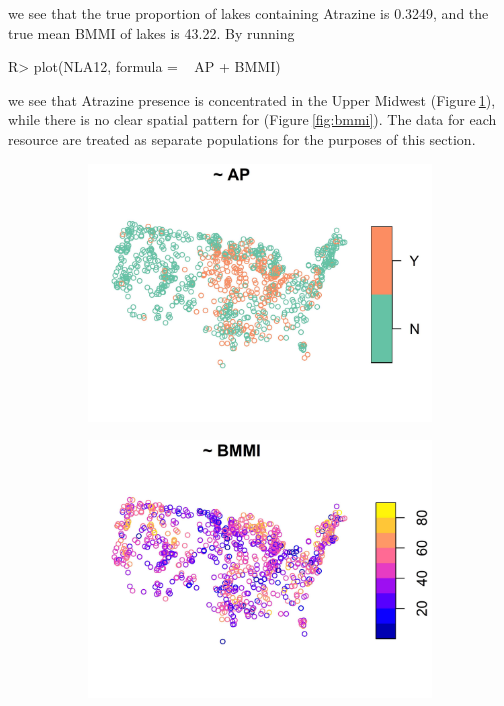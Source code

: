\documentclass[
  shortnames]{jss}
\begin{document}
we see that the true proportion of lakes containing Atrazine is 0.3249,
and the true mean BMMI of lakes is 43.22. By running

\begin{CodeChunk}
\begin{CodeInput}
R> plot(NLA12, formula = ~ AP + BMMI)
\end{CodeInput}
\end{CodeChunk}

we see that Atrazine presence is concentrated in the Upper Midwest
(Figure\(~\)\ref{fig:atrazine}), while there is no clear spatial pattern
for  (Figure\(~\)\ref{fig:bmmi}). The data for each resource
are treated as separate populations for the purposes of this section.

\begin{figure}
\centering
\begin{subfigure}{0.49\textwidth}
  \centering
  \includegraphics[width = 1\linewidth]{images/atrazine.jpeg}
  \caption{}
  \label{fig:atrazine}
\end{subfigure}
\begin{subfigure}{0.49\textwidth}
  \centering
  \includegraphics[width = 1\linewidth]{images/bmmi.jpeg}

\end{subfigure}
\end{figure}
\end{document}
